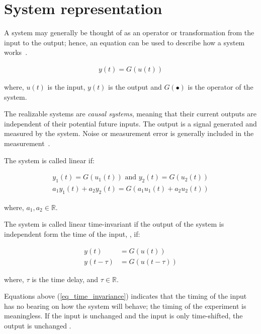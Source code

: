 
\section{System representation} 
\label{sec_system_representaion}

A system may generally be thought of as an operator or transformation from the input to the output; hence, an equation can be used to describe how a system works~\citep{fazekas2010fundamentals}.

\begin{align}
	y(t) = G(u(t)) 
\end{align}

where, $u(t)$ is the input, $y(t)$ is the output and $G(\bullet)$ is the operator of the system. 

The realizable systems are \textit{causal systems}, meaning that their current outputs are independent of their potential future inputs. The output is a signal generated and measured by the system. Noise or measurement error is generally included in the measurement~\citep[Chapter~2.1.1]{fazekas2010fundamentals}.

The system is called linear if:

\begin{subequations}	
	\begin{align}
		y_1(t) = G(u_1(t)) \text{ and } y_2(t) = G(u_2(t)) 
		\\
		a_1y_1(t) + a_2y_2(t) = G(a_1u_1(t) + a_2u_2(t))
	\end{align}	
\end{subequations}

where, $a_1, a_2 \in \mathbb{R}$.

The system is called linear time-invariant if the output of the system is independent form the time of the input, \ie, if:

\begin{subequations} \label{eq_time_invariance}
	\begin{align}
		y(t) &= G(u(t)) 
		\\
		y(t - \tau) &= G(u(t - \tau)) 
	\end{align}
\end{subequations}

where, $\tau$ is the time delay, and $\tau \in \mathbb{R}$.

Equations above (\ref{eq_time_invariance}) indicates that the timing of the input has no bearing on how the system will behave; the timing of the experiment is meaningless. If the input is unchanged and the input is only time-shifted, the output is unchanged \citep{fazekas2010fundamentals}.

